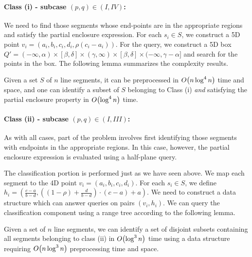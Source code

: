 \paragraph{Class (i) - subcase $(p, q) \in (I, IV)$:}

We need to find those segments whose end-points are in the appropriate regions 
and satisfy the partial enclosure expression. For each $s_i \in S$, we construct 
a 5D 
point $v_i = (a_i, b_i, c_i, d_i, \rho(c_i - a_i))$. For the query, we construct 
a 5D box
$Q'= (-\infty, \alpha) \times [\beta, \delta] \times (\gamma, \infty) 
\times [\beta, \delta] \times (-\infty, \gamma - \alpha]$ and search for the 
points in the box. 
 The following lemma summarizes the complexity results. 

\begin{lemma}
\label{lem:ao:class1:v}
Given a set $S$ of $n$ line segments, it can be preprocessed 
in $O\!\left(n\log^4{n}\right)$ time and space, and one
can identify a subset of $S$ belonging to Class (i) \emph{and} 
satisfying the partial enclosure property in $O\!\left(\log^4{n}\right)$ 
time.  
\end{lemma}

\paragraph{Class (ii) - subcase $(p, q) \in (I, III)$:} 
As with all cases, part of the problem involves first identifying those segments 
with endpoints in the appropriate regions.
In this case, however, the partial enclosure expression is evaluated using a 
half-plane query.

The classification portion is performed just as we have seen above. We map each 
segment to the 4D point $v_i = ( a_i, b_i, c_i, d_i )$.
For each $s_i \in S$, we define $h_i = \left ( \frac{c - a}{b - d}, \left ( (1 - 
\rho) + \frac{d}{b-d} \right ) \cdot (c-a) + a \right )$.
We need to construct a data structure which can answer queries on pairs $(v_i, 
h_i)$.
We can query the classification component using a range tree according to the 
following lemma.
\begin{lemma}
\label{lem:ao:class2:v}
Given a set of $n$ line segments, we can identify a set of disjoint subsets 
containing all segments belonging to class (ii) in $O\!\left(\log^3{n}\right)$ time 
using a data structure requiring $O\!\left(n\log^3{n}\right)$ preprocessing time and 
space.
\end{lemma}

